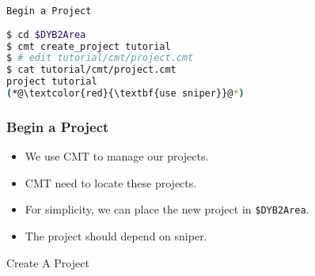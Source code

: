 \begin{frame}
    \begin{center}
        \LARGE \tt{Begin a Project}
    \end{center}
\end{frame}

\newsavebox{\createproject}
\begin{lrbox}{\createproject}
\begin{lstlisting}[language=bash]
$ cd $DYB2Area
$ cmt create_project tutorial
$ # edit tutorial/cmt/project.cmt
$ cat tutorial/cmt/project.cmt
project tutorial
(*@\textcolor{red}{\textbf{use sniper}}@*)
\end{lstlisting}
\end{lrbox}

\begin{frame}
    \frametitle{Begin a Project}
    \begin{itemize}
        \item We use CMT to manage our projects.
        \item CMT need to locate these projects.
        \item For simplicity, we can place the
               new project in {\tt \$DYB2Area}.
        \item The project should depend on sniper.
    \end{itemize}
    \begin{block}{Create A Project}
        \par\usebox{\createproject}
    \end{block}
\end{frame}

